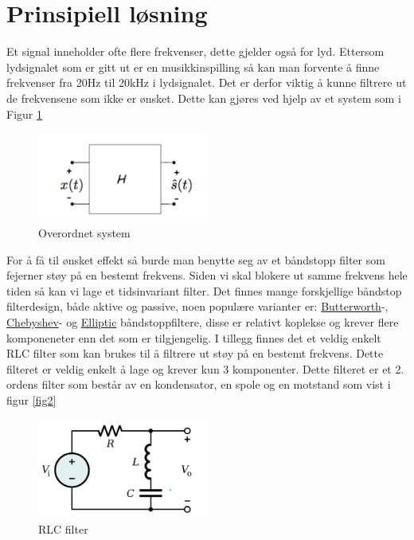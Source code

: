 \newpage
\section{Prinsipiell løsning}
\label{prinsipiellLoesning}


Et signal inneholder ofte flere frekvenser, dette gjelder også for lyd. Ettersom lydsignalet som er gitt ut er en musikkinspilling så kan man forvente å finne frekvenser fra 20Hz til 20kHz \cite{Frq_in_audio} i lydsignalet. Det er derfor viktig å kunne filtrere ut de frekvensene som ikke er ønsket. Dette kan gjøres ved hjelp av et system som i Figur \ref{fig:fig1}

\begin{figure}[!h]
	\centering
	\includegraphics[width=0.5\textwidth]{Bilder/Overordnetsystem.png}
	\caption{Overordnet system}
	\label{fig:fig1}
\end{figure}

For å få til ønsket effekt så burde man benytte seg av et båndstopp filter som fejerner støy på en bestemt frekvens. Siden vi skal blokere ut samme frekvens hele tiden så kan vi lage et tidsinvariant filter. Det finnes mange forskjellige båndstop filterdesign, både aktive og passive, noen populære varianter er: \href{https://www.falstad.com/afilter/circuitjs.html?cct=$+1+0.000005+5+50+5+50%0A%25+0+4540.3852025771785%0Ar+928+256+928+432+0+50%0A170+784+256+752+256+2+20+4000+5+0.1%0AO+928+256+992+256+0%0Aw+784+208+784+256+0%0Aw+864+208+864+256+0%0Ag+864+432+864+448+0%0Ag+928+432+928+448+0%0Ac+784+256+864+256+0+0.000004593296450259804+0%0Ac+864+352+864+432+0+1.7108344904994753e-7+0%0Al+784+208+864+208+0+0.0008554172452497378+0%0Al+864+256+864+352+0+0.022966482251299023+0%0AB+784+128+864+528+3+Box%0Aw+864+256+928+256+0%0A}{Butterworth}-, \href{https://en.wikipedia.org/wiki/Chebyshev_filter}{Chebyshev}- og \href{https://www.sciencedirect.com/topics/engineering/elliptic-filters}{Elliptic} båndstoppfiltere, disse er relativt koplekse og krever flere komponeneter enn det som er tilgjengelig. I tillegg finnes det et veldig enkelt RLC filter som kan brukes til å filtrere ut støy på en bestemt frekvens. Dette filteret er veldig enkelt å lage og krever kun 3 komponenter. Dette filteret er et 2. ordens filter som består av en kondensator, en spole og en motstand som vist i figur \ref{fig2}

\begin{figure}[!h]
	\centering
	\includegraphics[width=0.5\textwidth]{Bilder/Band-Reject_Filter.svg.png}
	\caption{RLC filter}
	\label{fig:fig2}
\end{figure}

